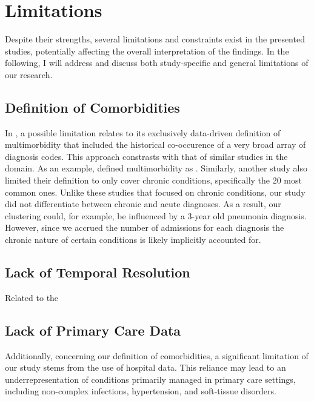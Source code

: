 \section{Limitations}

Despite their strengths,
several limitations and constraints
exist in the presented studies,
potentially affecting the overall interpretation of the findings.
In the following,
I will address and discuss both study-specific
and general limitations of our research.

\subsection{Definition of Comorbidities}

In \studyi{},
a possible limitation relates to its exclusively data-driven definition
of multimorbidity that included the historical co-occurence of a very broad 
array of diagnosis codes.
This approach constrasts with that of similar studies in the domain.
As an example, 
\textcite{formanMultimorbidity2018}
defined multimorbidity as
. 
Similarly, another study also limited their definition
to only cover chronic conditions, specifically the 20 most
common ones.
\autocite{roccaPrevalence2014}
Unlike these studies that focused on chronic conditions,
our study did not differentiate between chronic and acute diagnoses. 
As a result, our clustering could, for example, 
be influenced by a 3-year old pneumonia diagnosis.
However, since we accrued the number of admissions for each diagnosis
the chronic nature of certain conditions is likely implicitly accounted
for.

\subsection{Lack of Temporal Resolution}

Related to the 


\subsection{Lack of Primary Care Data}


Additionally, concerning our definition of comorbidities, a significant
limitation of our study stems from the use of hospital data. 
This reliance may
lead to an underrepresentation of conditions primarily managed in primary care
settings, including  non-complex infections, hypertension, and
soft-tissue disorders.
~\autocite{finleyWhat2018} 



